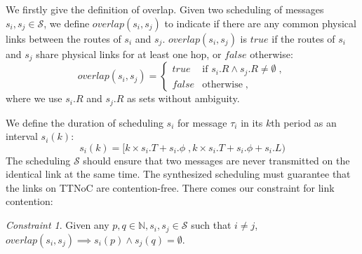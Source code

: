 \documentclass[journal]{IEEEtran}
\newcommand{\calS}{\mathcal{S}}
\theoremstyle{remark}
\newtheorem{constraint}{Constraint}
\begin{document}
We firstly give the definition of overlap.
Given two scheduling of messages $s_i,s_j\in\calS$, %
 we define $overlap(s_i,s_j)$ to indicate if there are any common physical links between the routes of $s_i$ and $s_j$.
$overlap(s_i,s_j)$ is $true$ if the routes of $s_i$ and $s_j$ share
physical links for at least one hop, or $false$ otherwise:
\begin{equation}
\label{e:overlap}
overlap(s_i,s_j)= 
\begin{cases}
  true &\mbox{if } s_i.R \wedge s_j.R \neq \emptyset \; ,\\
  false & \mbox{otherwise}\; ,
\end{cases}
\end{equation}
where we use $s_i.R$ and $s_j.R$ as sets without ambiguity.

We define the duration of scheduling $s_i$ for message $\tau_i$ in its $k$th
period as an interval $s_i(k)$:
\begin{equation}
\label{e:duration}
s_i(k) = [k\times s_i.T+s_i.\phi \; , k\times s_i.T+s_i.\phi+s_i.L)
\end{equation}  
The scheduling $\calS$ should ensure that two messages are never transmitted on the identical link at the same
time. 
The synthesized scheduling must guarantee that the links on TTNoC are contention-free.
There comes our constraint for link contention:
\begin{constraint}
\label{c:link}
  Given any $p,q\in\mathbb{N}, s_i,s_j \in \calS$ such that $i\neq j$, 
  $overlap(s_i,s_j) \implies s_i(p) \wedge s_j(q) = \emptyset$.


  
\end{constraint}
\end{document}
